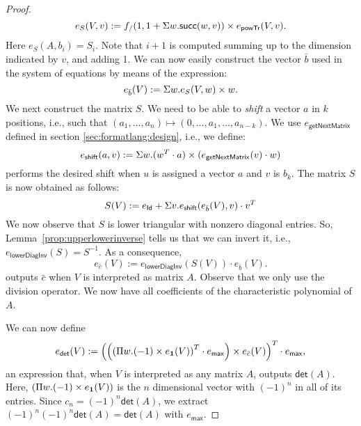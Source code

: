 \begin{proof}
    $$
    e_{S}(V,v):=f_{/}(1, 1 + \Sigma w. \mathsf{succ}(w,v))\times e_{\mathsf{powTr}}(V,v).
    $$
    Here $e_{S}(A,b_i)=S_i$. Note that $i+1$ is computed summing up to the dimension indicated by $v$, and adding 1.
    We can now easily construct the vector $\bar b$ used in the system of equations by means of the expression:
    $$
    e_{\bar b}(V):=\Sigma w.e_{S}(V,w)\times w.
    $$
    We next construct the matrix $S$. We need to be able to \textit{shift} a vector $a$ in $k$ positions, i.e.,
    such that $(a_1,\ldots,a_n)\mapsto (0,\ldots,a_1,\ldots,a_{n-k})$. We use $e_{\mathsf{getNextMatrix}}$ 
    defined in section \ref{sec:formatlang:design}, i.e., we define:
    $$
    e_{\mathsf{shift}}(a,v):=\Sigma w.(w^T\cdot a)\times(e_{\mathsf{getNextMatrix}}(v)\cdot w)
    $$
    performs the desired shift when $u$ is assigned a vector $a$ and $v$ is $b_k$. 
    The matrix $S$ is now obtained as follows:
    $$
    S(V):= e_{\mathsf{Id}} + \Sigma v. e_{\mathsf{shift}}(e_{\bar b}(V), v)\cdot v^T
    $$
    We now observe that $S$ is lower triangular with nonzero diagonal entries. So,
    Lemma~\ref{prop:upperlowerinverse} tells us that we can invert it, i.e.,
    $e_{\mathsf{lowerDiagInv}}(S)=S^{-1}$. As a consequence,
    $$
    e_{\bar c}(V):=e_{\mathsf{lowerDiagInv}}(S(V))\cdot e_{\bar b}(V).
    $$
    outputs $\bar c$ when $V$ is interpreted as matrix $A$. Observe that we only use the division operator. We now have all coefficients of the characteristic polynomial of $A$.


    We can now define
    $$
    e_{\mathsf{det}}(V):=\left( \left(\left( \Pi w. (-1)\times e_{\mathbf{1}}(V)\right)^T\cdot e_{\mathsf{max}}\right) \times e_{\bar c}(V) \right)^T\cdot e_{\mathsf{max}},
    $$
    an expression that, when $V$ is interpreted as any matrix $A$, outputs $\mathsf{det}(A)$.
    Here, $(\Pi w. (-1)\times e_{\mathbf{1}}(V))$ is the $n$ dimensional vector with $(-1)^n$ in all of its entries.
    Since $c_n=(-1)^n\mathsf{det}(A)$, we extract $(-1)^n(-1)^n\mathsf{det}(A)=\mathsf{det}(A)$ with $e_{\mathsf{max}}$.


\end{proof}
